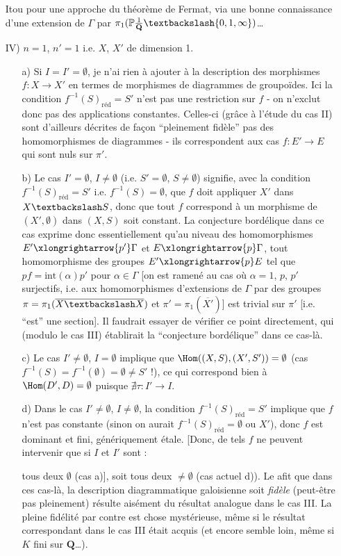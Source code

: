 \begin{enumerate}
    Itou pour une approche du théorème de Fermat, via une bonne connaissance d'une extension de $\Gamma$ par $\pi_1(\mathbb{P}\frac{1}{\mathbf{Q}}\textbackslash \{ 0, 1, \infty \})$\dots
    \item[IV)] $n = 1$, $n' = 1$ i.e. $X$, $X'$ de dimension 1.
    \begin{enumerate}
        \item[a)] Si $I = I' = \emptyset$, je n'ai rien à ajouter à la description des morphismes $f: X \to X'$ en termes de morphismes de diagrammes de groupoïdes. Ici la condition $f^{-1}(S)_{\text{réd}} = S'$ n'est pas une restriction sur $f$ - on n'exclut donc pas des applications constantes. Celles-ci (grâce à l'étude du cas II) sont d'ailleurs décrites de fa\c{c}on ``pleinement fidèle'' pas des homomorphismes de diagrammes - ils correspondent aux cas $f: E' \to E$ qui sont nuls sur $\pi'$.
        \item[b)] Le cas $I' = \emptyset$, $I \neq \emptyset$ (i.e. $S' = \emptyset$, $S \neq \emptyset$) signifie, avec la condition $f^{-1}(S)_{\text{réd}} = S'$ i.e. $f^{-1}(S) = \emptyset$, que $f$ doit appliquer $X'$ dans $X \textbackslash S$, donc que tout $f$ correspond à un morphisme de $(X', \emptyset)$ dans $(X, S)$ soit constant. La conjecture bordélique dans ce cas exprime donc essentiellement qu'au niveau des homomorphismes $E' \xlongrightarrow{p'} \Gamma$ et $E \xlongrightarrow{p} \Gamma$, tout homomorphisme des groupes $E' \xlongrightarrow{p} E$ tel que $pf = \text{int}(\alpha)p'$ pour $\alpha \in \Gamma$ [on est ramené au cas où $\alpha = 1$, $p$, $p'$ surjectifs, i.e. aux homomorphismes d'extensions de $\Gamma$ par des groupes $\pi = \pi_1 (\overline{X \textbackslash X})$ et $\pi' = \pi_1(\overline{X'})$] est trivial sur $\pi'$ [i.e. ``est'' une section]. Il faudrait essayer de vérifier ce point directement, qui (modulo le cas III) établirait la ``conjecture bordélique'' dans ce cas-là.
        \item[c)] Le cas $I' \neq \emptyset$, $I = \emptyset$ implique que $\Hom((X, S), (X', S')) = \emptyset$ (cas $f^{-1}(S) = f^{-1}(\emptyset) = \emptyset \neq S'$ !), ce qui correspond bien à $\Hom(D', D) = \emptyset$ puisque $\nexists \tau: I' \to I$.
        \item[d)] Dans le cas $I' \neq \emptyset$, $I \neq \emptyset$, la condition $f^{-1}(S)_{\text{réd}} = S'$ implique que $f$ n'est pas constante (sinon on aurait $f^{-1}(S)_{\text{réd}} = \emptyset$ ou $X'$), donc $f$ est dominant et fini, génériquement étale. [Donc, de tels $f$ ne peuvent intervenir que si $I$ et $I'$ sont :
        
        tous deux $\emptyset$ (cas a)], soit tous deux $\neq \emptyset$ (cas actuel d)). Le afit que dans ces cas-là, la description diagrammatique galoisienne soit \emph{fidèle} (peut-être pas pleinement) résulte aisément du résultat analogue dans le cas III. La pleine fidélité par contre est chose mystérieuse, même si le résultat correspondant dans le cas III était acquis (et encore semble loin, même si $K$ fini sur $\mathbf{Q}$\dots).
    \end{enumerate}
\end{enumerate}

